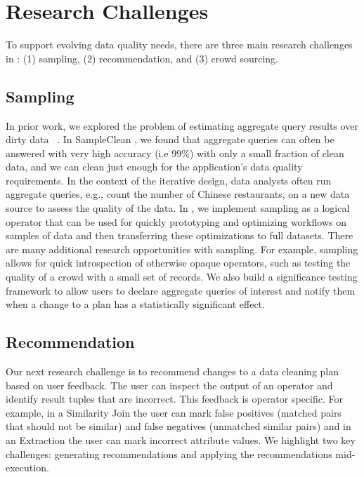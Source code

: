 \section{Research Challenges}
To support evolving data quality needs, there are three main research challenges in \sys: (1) sampling, (2) recommendation, and (3) crowd sourcing.

\subsection{Sampling}
In prior work, we explored the problem of estimating aggregate query results over dirty data ~\cite{wang1999sample}.
In SampleClean \cite{wang1999sample}, we found that aggregate queries can often be answered with very high accuracy (i.e 99\%) with only a small fraction of clean data, and we can clean just enough for the application's data quality requirements.
In the context of the iterative design, data analysts often run aggregate queries, e.g., count the number of Chinese restaurants, on a new data source to assess the quality of the data.
In \sys, we implement sampling as a logical operator that can be used for quickly prototyping and optimizing workflows on samples of data and then transferring these optimizations to full datasets.
There are many additional research opportunities with sampling.
For example, sampling allows for quick introspection of otherwise opaque operators, such as testing the quality of a crowd with a small set of records.
We also build a significance testing framework to allow users to declare aggregate queries of interest and notify them when a change to 
a plan has a statistically significant effect.

\subsection{Recommendation}
Our next research challenge is to recommend changes to a data cleaning plan based on user feedback. 
The user can inspect the output of an operator and identify result tuples that are incorrect. This feedback is operator specific. For example, in a Similarity Join the user can mark false positives (matched pairs that should not be similar) and false negatives (unmatched similar pairs) and in an Extraction the user can mark incorrect attribute values. 
We highlight two key challenges: generating recommendations and applying the recommendations mid-execution.

\vspace{.25em}

